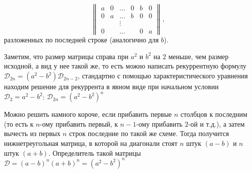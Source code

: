 \begin{solution}
\begin{remark}
        \begin{equation}
            \begin{Vmatrix}
                a & 0 & \ldots & 0 & b & 0 \\
                0 & a & \ldots & b & 0 & 0 \\
                & &\vdots \\
                0 & & \ldots & & 0 & a
            \end{Vmatrix},
        \end{equation}
        разложенных по последней строке (аналогично для $b$).
    \end{remark}
    Заметим, что размер матрицы справа при $a^2$ и $b^2$ на $2$ меньше, чем размер исходной, а вид у нее такой же, то есть можно написать рекуррентную формулу $\mathcal{D}_{2n} = (a^2 - b^2)\mathcal{D}_{2n-2}$, стандартно с помощью характеристического уравнения находим решение для рекуррента в явном виде при начальном условии $\mathcal{D}_2 = a^2 - b^2$: $\mathcal{D}_{2n} = (a^2 - b^2)^n$
\end{solution}
\begin{remark}
    Можно решить намного короче, если прибавить первые $n$ столбцов к последним (то есть к $n$-ому прибавить первый, к $n-1$-ому прибавить $2$-ой и т.д.), а затем вычесть из первых $n$ строк последние по такой же схеме.
    Тогда получится нижнетреугольная матрица, в которой на диагонали стоят $n$ штук $(a-b)$ и $n$ штук $(a+b)$.
    Определитель такой матрицы $\mathcal{D} = (a-b)^n(a+b)^n = (a^2 - b^2)^n$
\end{remark}